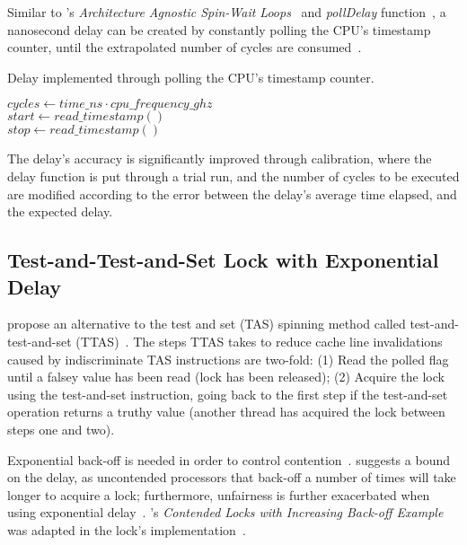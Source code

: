 
Similar to \citeauthor{intel2018spinloop}'s
\emph{Architecture Agnostic Spin-Wait Loops}~\citep{intel2018spinloop} and
\emph{pollDelay} function~\citep[Example~2.3]{intelmanualoptimization}, a
nanosecond delay can be created by constantly polling the CPU's timestamp
counter, until the extrapolated number of cycles are
consumed~\cite{ramalhete2019delay}.

\begin{algorithm}
    \caption{Delay implemented through polling the CPU's timestamp counter.}\label{alg:delay}
            $cycles \gets time\_ns \cdot cpu\_frequency\_ghz$ \\
            $start \gets read\_timestamp()$ \\
            {
                $stop \gets read\_timestamp()$
            }
\end{algorithm}

The delay's accuracy is significantly improved through calibration, where the
delay function is put through a trial run, and the number of cycles to be
executed are modified according to the error between the delay's average time
elapsed, and the expected delay.

\subsection{Test-and-Test-and-Set Lock with Exponential Delay}
\citeauthor{rudolph1984dynamic} propose an alternative to the test and set
(TAS) spinning method called test-and-test-and-set
(TTAS)~\citep{rudolph1984dynamic}. The steps TTAS takes to reduce cache line
invalidations caused by indiscriminate TAS instructions are two-fold: (1) Read
the polled flag until a falsey value has been read (lock has been released);
(2) Acquire the lock using the test-and-set instruction, going back to the
first step if the test-and-set operation returns a truthy value (another thread
has acquired the lock between steps one and two). 

Exponential back-off is needed in order to control
contention~\citep{valois1994queues}. \citeauthor{anderson1990performance}
suggests a bound on the delay, as uncontended processors that back-off a number
of times will take longer to acquire a lock; furthermore, unfairness is further
exacerbated when using exponential delay~\citep[Section~7.4]{herlihy2020art}.
\citeauthor{intelmanualoptimization}'s \emph{Contended Locks with Increasing
Back-off Example} was adapted in the lock's implementation~\citep{intelmanualoptimization}.

